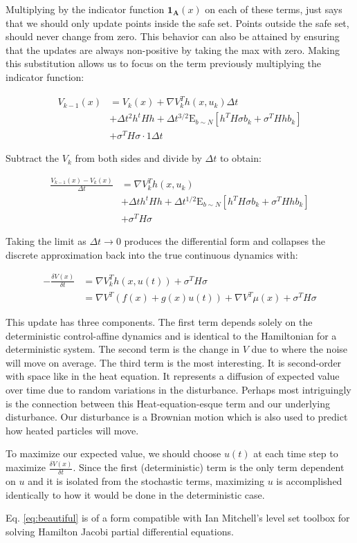 \documentclass[a4paper]{article}
\begin{document}
Multiplying by the indicator function $\mathbf{1_A}(x)$ on each of these terms, just says that we should only update points inside the safe set.
Points outside the safe set, should never change from zero.
This behavior can also be attained by ensuring that the updates are always non-positive by taking the max with zero.
Making this substitution allows us to focus on the term previously multiplying the indicator function:

\begin{align}
V_{k-1}(x) & = V_k( x ) + \nabla V_k^T h(x,u_k) \Delta t
\\ & + \Delta t^2 h^t H h + \Delta t^{3/2} \mathrm{E}_{b\sim N} [ h^T H \sigma b_k + \sigma^T H h b_k]
\\ & + \sigma^T H \sigma \cdot 1 \Delta t
\end{align}

Subtract the $V_k$ from both sides and divide by $\Delta t$ to obtain:

\begin{align}
\frac{V_{k-1}(x) - V_k(x)}{\Delta t} & = \nabla V_k^T h(x,u_k)
\\ & + \Delta t h^t H h + \Delta t^{1/2} \mathrm{E}_{b\sim N} [ h^T H \sigma b_k + \sigma^T H h b_k]
\\ & + \sigma^T H \sigma
\end{align}

Taking the limit as $\Delta t \rightarrow 0$ produces the differential form and collapses the discrete approximation back into the true continuous dynamics with:

\begin{align}
-\frac{\delta V(x)}{\delta t} &= \nabla V_k^T h(x,u(t)) + \sigma^T H \sigma
\\ &= \nabla V^T (f(x) + g(x) u(t)) + \nabla V^T \mu(x) + \sigma^T H \sigma
\label{eq:beautiful}
\end{align}

This update has three components.
The first term depends solely on the deterministic control-affine dynamics and is identical to the Hamiltonian for a deterministic system.
The second term is the change in $V$ due to where the noise will move on average.
The third term is the most interesting.
It is second-order with space like in the heat equation.
It represents a diffusion of expected value over time due to random variations in the disturbance.
Perhaps most intriguingly is the connection between this Heat-equation-esque term and our underlying disturbance.
Our disturbance is a Brownian motion which is also used to predict how heated particles will move.

To maximize our expected value, we should choose $u(t)$ at each time step to maximize $\frac{\delta V(x)}{\delta t}$.
Since the first (deterministic) term is the only term dependent on $u$ and it is isolated from the stochastic terms, maximizing $u$ is accomplished identically to how it would be done in the deterministic case.

Eq. \ref{eq:beautiful} is of a form compatible with Ian Mitchell's level set toolbox for solving Hamilton Jacobi partial differential equations.
\end{document}
